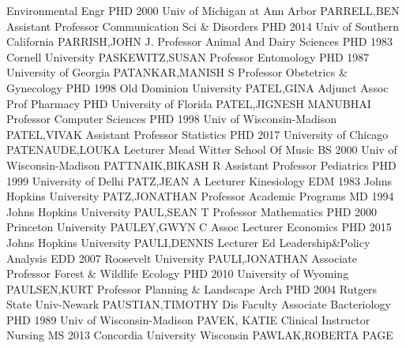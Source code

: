 \documentclass[
]{article}
\begin{document}
Environmental Engr \textbar PHD 2000 Univ of Michigan at Ann Arbor
\textbar{}  \textbar PARRELL,BEN \textbar Assistant
Professor \textbar Communication Sci \& Disorders \textbar PHD 2014 Univ
of Southern California \textbar{}  \textbar PARRISH,JOHN J.
\textbar Professor \textbar Animal And Dairy Sciences \textbar PHD 1983
Cornell University \textbar{}  \textbar PASKEWITZ,SUSAN
\textbar Professor \textbar Entomology \textbar PHD 1987 University of
Georgia \textbar{}  \textbar PATANKAR,MANISH S
\textbar Professor \textbar Obstetrics \& Gynecology \textbar PHD 1998
Old Dominion University \textbar{}  \textbar PATEL,GINA
\textbar Adjunct Assoc Prof \textbar Pharmacy \textbar PHD University of
Florida \textbar{}  \textbar PATEL,JIGNESH MANUBHAI
\textbar Professor \textbar Computer Sciences \textbar PHD 1998 Univ of
Wisconsin-Madison \textbar{}  \textbar PATEL,VIVAK
\textbar Assistant Professor \textbar Statistics \textbar PHD 2017
University of Chicago \textbar{}  \textbar PATENAUDE,LOUKA
\textbar Lecturer \textbar Mead Witter School Of Music \textbar BS 2000
Univ of Wisconsin-Madison \textbar{} 
\textbar PATTNAIK,BIKASH R \textbar Assistant Professor
\textbar Pediatrics \textbar PHD 1999 University of Delhi \textbar{}
 \textbar PATZ,JEAN A \textbar Lecturer \textbar Kinesiology
\textbar EDM 1983 Johns Hopkins University \textbar{} 
\textbar PATZ,JONATHAN \textbar Professor \textbar Academic Programs
\textbar MD 1994 Johns Hopkins University \textbar{} 
\textbar PAUL,SEAN T \textbar Professor \textbar Mathematics
\textbar PHD 2000 Princeton University \textbar{} 
\textbar PAULEY,GWYN C \textbar Assoc Lecturer \textbar Economics
\textbar PHD 2015 Johns Hopkins University \textbar{} 
\textbar PAULI,DENNIS \textbar Lecturer \textbar Ed Leadership\&Policy
Analysis \textbar EDD 2007 Roosevelt University \textbar{} 
\textbar PAULI,JONATHAN \textbar Associate Professor \textbar Forest \&
Wildlife Ecology \textbar PHD 2010 University of Wyoming \textbar{}
 \textbar PAULSEN,KURT \textbar Professor \textbar Planning
\& Landscape Arch \textbar PHD 2004 Rutgers State Univ-Newark \textbar{}
 \textbar PAUSTIAN,TIMOTHY \textbar Dis Faculty Associate
\textbar Bacteriology \textbar PHD 1989 Univ of Wisconsin-Madison
\textbar{}  \textbar PAVEK, KATIE \textbar Clinical
Instructor \textbar Nursing \textbar MS 2013 Concordia University
Wisconsin \textbar{}  \textbar PAWLAK,ROBERTA PAGE
\end{document}

